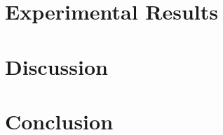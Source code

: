 \documentclass[conference]{ieeeconf}
\begin{document}
\section{Experimental Results}\label{sec:expresults}




\section{Discussion}\label{sec:disc}




\section{Conclusion}\label{sec:conc}





\end{document}
